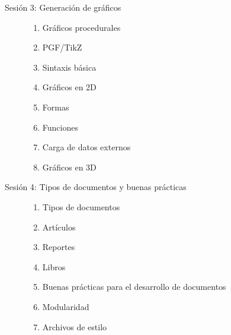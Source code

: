 \documentclass[12pt, twoside, a4paper, final]{article}
\begin{document}
\begin{description}
        \item[Sesión 3: Generación de gráficos] \hfill
            \begin{enumerate}
                \item Gráficos procedurales
                \item PGF/TikZ
                \item Sintaxis básica
                \item Gráficos en 2D
                \item Formas
                \item Funciones
                \item Carga de datos externos
                \item Gráficos en 3D
            \end{enumerate}

        \item[Sesión 4: Tipos de documentos y buenas prácticas] \hfill
            \begin{enumerate}
                \item Tipos de documentos
                \item Artículos
                \item Reportes
                \item Libros
                \item Buenas prácticas para el desarrollo de documentos
                \item Modularidad
                \item Archivos de estilo
            \end{enumerate}
    \end{description}
\end{document}
